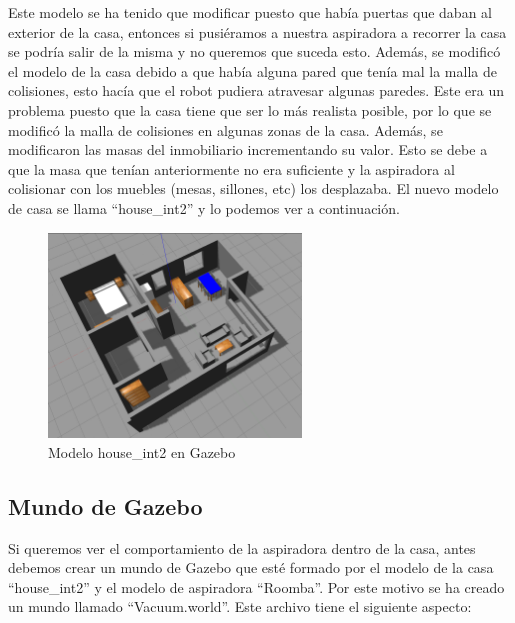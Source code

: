 Este modelo se ha tenido que modificar puesto que había puertas que daban al exterior de la casa, entonces si pusiéramos a nuestra aspiradora a recorrer la casa se podría salir de la misma y no queremos que suceda esto. Además, se modificó el modelo de la casa debido a que había alguna pared que tenía mal la malla de colisiones, esto hacía que el robot pudiera atravesar algunas paredes. Este era un problema puesto que la casa tiene que ser lo más realista posible, por lo que se modificó la malla de colisiones en algunas zonas de la casa. Además, se modificaron las masas del inmobiliario incrementando su valor. Esto se debe a que la masa que tenían anteriormente no era suficiente y la aspiradora al colisionar con los muebles (mesas, sillones, etc) los desplazaba. El nuevo modelo de casa se llama “house\_int2” y lo podemos ver a continuación.\\

\begin{figure}[H]
  \begin{center}
    \includegraphics[width=0.6\textwidth]{figures/Vacuum/casa.png}
		\caption{Modelo house\_int2 en Gazebo}
		\label{fig.casa}
		\end{center}
\end{figure}

\subsection{Mundo de Gazebo}
Si queremos ver el comportamiento de la aspiradora dentro de la casa, antes debemos crear un mundo de Gazebo que esté formado por el modelo de la casa ``house\_int2'' y el modelo de aspiradora ``Roomba''. Por este motivo se ha creado un mundo llamado ``Vacuum.world''. Este archivo tiene el siguiente aspecto:

